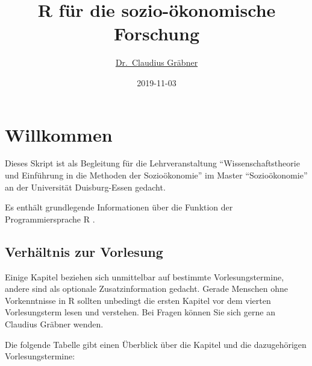 \documentclass[]{tufte-book}
\title{R für die sozio-ökonomische Forschung}
\author{\href{http://claudius-graebner.com/}{Dr.~Claudius Gräbner}}
\date{2019-11-03}
\begin{document}
\maketitle



{
\setcounter{tocdepth}{1}
\tableofcontents
}

\chapter*{Willkommen}\label{willkommen}

Dieses Skript ist als Begleitung für die Lehrveranstaltung
``Wissenschaftstheorie und Einführung in die Methoden der
Sozioökonomie'' im Master ``Sozioökonomie'' an der Universität
Duisburg-Essen gedacht.

Es enthält grundlegende Informationen über die Funktion der
Programmiersprache R \citep{R-Team}.

\section*{Verhältnis zur Vorlesung}\label{verhaltnis-zur-vorlesung}

Einige Kapitel beziehen sich unmittelbar auf bestimmte
Vorlesungstermine, andere sind als optionale Zusatzinformation gedacht.
Gerade Menschen ohne Vorkenntnisse in R sollten unbedingt die ersten
Kapitel vor dem vierten Vorlesungsterm lesen und verstehen. Bei Fragen
können Sie sich gerne an Claudius Gräbner wenden.

Die folgende Tabelle gibt einen Überblick über die Kapitel und die
dazugehörigen Vorlesungstermine:
\end{document}
